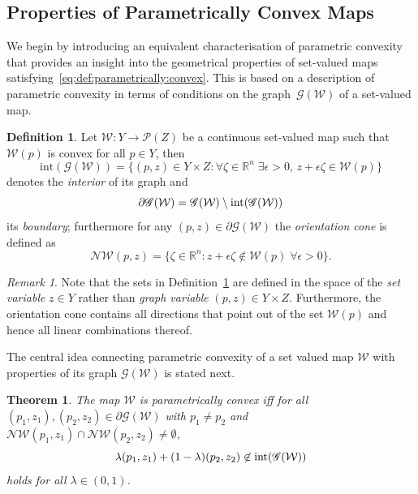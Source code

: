 \documentclass{elsarticle}
\newcounter{thmcount}
\newtheorem{thm}[thmcount]{Theorem}
\theoremstyle{remark}
\newtheorem{rem}[thmcount]{Remark}
\theoremstyle{definition}
\newtheorem{defi}[thmcount]{Definition}
\begin{document}
\subsection{Properties of Parametrically Convex Maps}\label{ssec:properties:of:p:convex:maps}
%
We begin by introducing an equivalent characterisation of parametric convexity that provides an insight into the geometrical properties of 
set-valued maps satisfying~\eqref{eq:def:parametrically:convex}.
%
This is based on a description of parametric convexity in terms of conditions on the graph~$\mathscr G(\mathcal W)$ of a set-valued map.
%
\begin{defi}\label{def:graph:of:map}
Let $\mathcal W:Y\rightarrow \mathscr P(Z)$ be a continuous set-valued map
such that $\mathcal W(p)$ is convex for all $p\in Y$, then 
%
\begin{equation*}  
\text{int}(\mathscr G(\mathcal W)) = \{(p,z) \in Y\times Z : \forall \zeta\in\mathbb R^n\;\exists \epsilon>0, \, z+\epsilon \zeta\in \mathcal W(p) \}
\end{equation*}
%
denotes the \emph{interior} of its graph and
%
\[
  \partial \mathscr G(\mathcal W) = \mathscr G(\mathcal W)\setminus \textup{int}(\mathscr G(\mathcal W))
\]
%
its \emph{boundary};
%
furthermore for any $(p,z)\in\partial\mathscr G(\mathcal W)$ the \emph{orientation cone} is defined as 
%
\[
  \mathcal N\mathcal W(p,z) = \{\zeta \in\mathbb R^n: z+\epsilon \zeta \not\in \mathcal W(p)\; \forall \epsilon>0\} .
\]
%
\end{defi}
%
\begin{rem}
%
Note that the sets in Definition~\ref{def:graph:of:map} are defined in the space of the \emph{set variable} $z\in Y$ rather than \emph{graph variable} $(p,z)\in Y\times Z$.
%
Furthermore, the orientation cone contains all directions that point out of the set $\mathcal W(p)$ and hence all linear combinations thereof.
%
\end{rem}
%
The central idea connecting parametric convexity of a set valued map $\mathcal W$ with properties of its graph $\mathscr G(\mathcal W)$ is stated next.
%
\begin{thm}\label{thm:p:convexity:graph}
The map $\mathcal W$ is parametrically convex iff for all $(p_1,z_1), (p_2,z_2)\in\partial\mathscr G(\mathcal W)$
with $p_1\neq p_2$ and $\mathcal N\mathcal W(p_1,z_1)\cap\mathcal N\mathcal W(p_2,z_2)\neq\emptyset$,
%
\begin{equation}\label{eq:graph:def:p:convexity}
\lambda (p_1,z_1) + (1-\lambda) (p_2,z_2) \not\in\textup{int} (\mathscr G(\mathcal W))
\end{equation}
%
holds for all $\lambda\in(0,1)$.
%
\end{thm}
\end{document}
